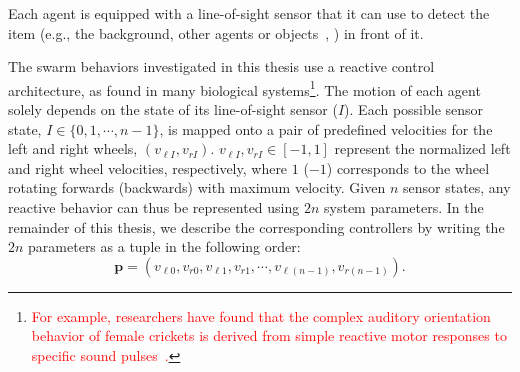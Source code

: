 Each agent is equipped with a line-of-sight sensor that it can use to detect the item (e.g., the background, other agents or objects~\cite{Gauci2014_ijrr}, \cite{Melvin2014_aamas}) in front of it. 

The swarm behaviors investigated in this thesis use a reactive control architecture, as found in many biological systems\footnote{\textcolor{red}{For example, researchers have found that the complex auditory orientation behavior of female crickets is derived from simple reactive motor responses to specific sound pulses~\cite{Hedwig2004}.}}. 
The motion of each agent solely depends on the state of its line-of-sight sensor ($I$). Each possible sensor state, $I\in\{0,1,\cdots,n-1\}$, is mapped onto a pair of predefined velocities for the left and right wheels, $(v_{\ell I}, v_{rI})$. $v_{\ell I}, v_{rI} \in \left[-1,1\right]$ represent the normalized left and right wheel velocities, respectively, where $1$ ($-1$) corresponds to the wheel rotating forwards (backwards) with maximum velocity. Given $n$ sensor states, any reactive behavior can thus be represented using $2n$ system parameters. In the remainder of this thesis, we describe the corresponding controllers by writing the $2n$ parameters as a tuple in the following order:
\begin{equation}\label{controller:form}
\mathbf{p} = (v_{\ell 0}, v_{r0}, v_{\ell1}, v_{r1}, \cdots, v_{\ell (n-1)}, v_{r (n-1)}).
\end{equation}

